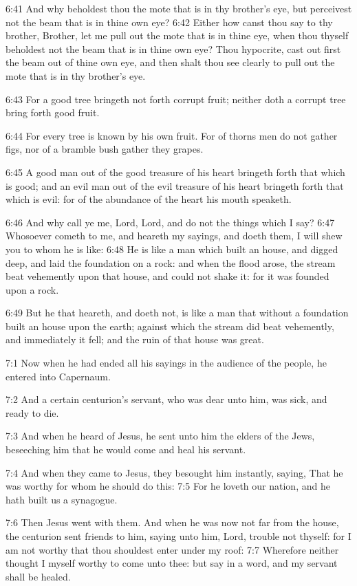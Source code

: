 6:41 And why beholdest thou the mote that is in thy brother's eye, but
perceivest not the beam that is in thine own eye?  6:42 Either how
canst thou say to thy brother, Brother, let me pull out the mote that
is in thine eye, when thou thyself beholdest not the beam that is in
thine own eye? Thou hypocrite, cast out first the beam out of thine
own eye, and then shalt thou see clearly to pull out the mote that is
in thy brother's eye.

6:43 For a good tree bringeth not forth corrupt fruit; neither doth a
corrupt tree bring forth good fruit.

6:44 For every tree is known by his own fruit. For of thorns men do
not gather figs, nor of a bramble bush gather they grapes.

6:45 A good man out of the good treasure of his heart bringeth forth
that which is good; and an evil man out of the evil treasure of his
heart bringeth forth that which is evil: for of the abundance of the
heart his mouth speaketh.

6:46 And why call ye me, Lord, Lord, and do not the things which I
say?  6:47 Whosoever cometh to me, and heareth my sayings, and doeth
them, I will shew you to whom he is like: 6:48 He is like a man which
built an house, and digged deep, and laid the foundation on a rock:
and when the flood arose, the stream beat vehemently upon that house,
and could not shake it: for it was founded upon a rock.

6:49 But he that heareth, and doeth not, is like a man that without a
foundation built an house upon the earth; against which the stream did
beat vehemently, and immediately it fell; and the ruin of that house
was great.

7:1 Now when he had ended all his sayings in the audience of the
people, he entered into Capernaum.

7:2 And a certain centurion's servant, who was dear unto him, was
sick, and ready to die.

7:3 And when he heard of Jesus, he sent unto him the elders of the
Jews, beseeching him that he would come and heal his servant.

7:4 And when they came to Jesus, they besought him instantly, saying,
That he was worthy for whom he should do this: 7:5 For he loveth our
nation, and he hath built us a synagogue.

7:6 Then Jesus went with them. And when he was now not far from the
house, the centurion sent friends to him, saying unto him, Lord,
trouble not thyself: for I am not worthy that thou shouldest enter
under my roof: 7:7 Wherefore neither thought I myself worthy to come
unto thee: but say in a word, and my servant shall be healed.

